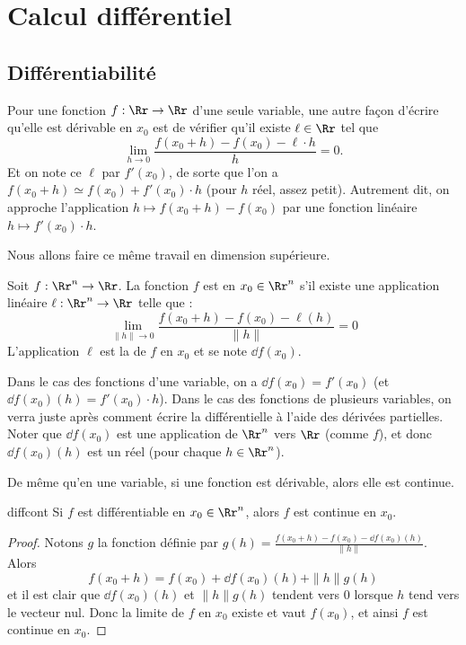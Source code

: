 
\section{Calcul différentiel}
\subsection{Différentiabilité}


Pour une fonction $f : \Rr \to \Rr$ d'une seule variable, une autre façon d'écrire qu'elle est dérivable en $x_0$ est de vérifier qu'il existe $\ell \in \Rr$ tel que 
$$\lim_{h \rightarrow 0} \frac{f(x_0 + h) - f(x_0) - \ell \cdot h}{h} = 0.$$
Et on note ce $\ell$ par $f'(x_0)$, de sorte que l'on a 
$f(x_0+h) \simeq f(x_0) + f'(x_0)\cdot h$ (pour $h$ réel, assez petit).
Autrement dit, on approche l'application $h \mapsto f(x_0+h) - f(x_0)$
par une fonction linéaire $h \mapsto f'(x_0) \cdot h$.

\bigskip

Nous allons faire ce même travail en dimension supérieure.
\begin{definition}{}{}
	Soit $f : \Rr^n \to \Rr$. La fonction $f$ est  en $x_0 \in \Rr^n$ s'il existe une application linéaire $\ell : \Rr^n \to \Rr$ telle que :
	$$\lim_{\|h\| \to 0}  \frac{f(x_0+ h) - f(x_0) - \ell(h)}{\|h\|} = 0$$
	L'application $\ell $ est la  de $f$ en $x_0$ et se note $\dd f(x_0)$.
\end{definition}


Dans le cas des fonctions d'une variable, on a $\dd f(x_0) = f'(x_0)$ (et $\dd f(x_0)(h) = f'(x_0)\cdot h$).
Dans le cas des fonctions de plusieurs variables, on verra juste après comment écrire la différentielle à l'aide des dérivées partielles.
Noter que $\dd f(x_0)$ est une application de $\Rr^n$ vers $\Rr$ (comme $f$), et donc $\dd f(x_0)(h)$ est un réel (pour chaque $h\in\Rr^n$).


\bigskip

De même qu'en une variable, si une fonction est dérivable, alors elle est continue.
\begin{proposition}{}{diffcont}
	Si $f$ est différentiable en $x_0 \in \Rr^n$, alors $f$ est continue en $x_0$.
\end{proposition}

\begin{proof}
	Notons $g$ la fonction définie par $g(h)=\frac{f(x_0+h) - f(x_0) - \dd f(x_0)(h)}{\|h\|}$. Alors 
	$$f(x_0 + h)=f(x_0) + \dd f(x_0)(h) +\|h\|g(h)$$
	et il est clair que $\dd f(x_0)(h)$ et $\|h\|g(h)$ tendent vers $0$ lorsque $h$ tend vers le vecteur nul. Donc la limite de $f$ en $x_0$ existe et vaut $f(x_0)$, et ainsi $f$ est continue en $x_0$.
\end{proof}

